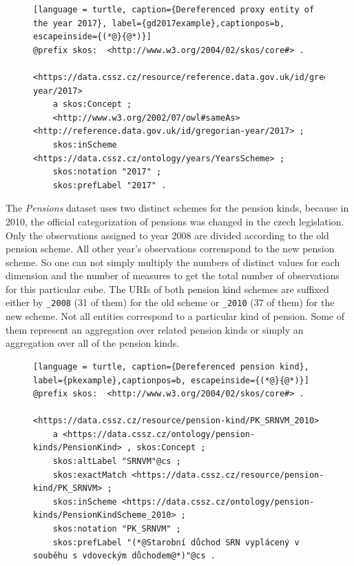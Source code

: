 \begin{figure}[h]
\begin{lstlisting}[language = turtle, caption={Dereferenced proxy entity of the year 2017}, label={gd2017example},captionpos=b, escapeinside={(*@}{@*)}]
@prefix skos:  <http://www.w3.org/2004/02/skos/core#> .

<https://data.cssz.cz/resource/reference.data.gov.uk/id/gregorian-year/2017>
    a skos:Concept ;
    <http://www.w3.org/2002/07/owl#sameAs> <http://reference.data.gov.uk/id/gregorian-year/2017> ;
    skos:inScheme <https://data.cssz.cz/ontology/years/YearsScheme> ;
    skos:notation "2017" ;
    skos:prefLabel "2017" .
\end{lstlisting}
\end{figure}

The \textit{Pensions} dataset uses two distinct schemes for the pension kinds, because in 2010, the official categorization of pensions was changed in the czech legislation. Only the observations assigned to year 2008 are divided according to the old pension scheme. All other year's observations correnspond to the new pension scheme. So one can not simply multiply the numbers of distinct values for each dimension and the number of measures to get the total number of observations for this particular cube. The URIs of both pension kind schemes are suffixed either by \verb|_2008| (31 of them) for the old scheme or \verb|_2010| (37 of them) for the new scheme. Not all entities correspond to a particular kind of pension. Some of them represent an aggregation over related pension kinds or simply an aggregation over all of the pension kinds.

\begin{figure}[h]
\begin{lstlisting}[language = turtle, caption={Dereferenced pension kind}, label={pkexample},captionpos=b, escapeinside={(*@}{@*)}]
@prefix skos:  <http://www.w3.org/2004/02/skos/core#> .

<https://data.cssz.cz/resource/pension-kind/PK_SRNVM_2010>
    a <https://data.cssz.cz/ontology/pension-kinds/PensionKind> , skos:Concept ;
    skos:altLabel "SRNVM"@cs ;
    skos:exactMatch <https://data.cssz.cz/resource/pension-kind/PK_SRNVM> ;
    skos:inScheme <https://data.cssz.cz/ontology/pension-kinds/PensionKindScheme_2010> ;
    skos:notation "PK_SRNVM" ;
    skos:prefLabel "(*@Starobní důchod SRN vyplácený v souběhu s vdoveckým důchodem@*)"@cs .
\end{lstlisting}
\end{figure}


